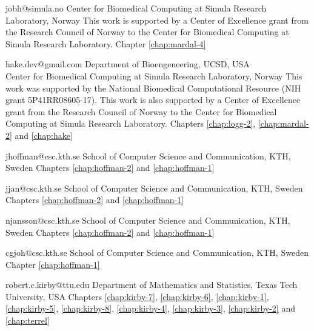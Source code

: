              {jobh@simula.no}
             {Center for Biomedical Computing at Simula Research
              Laboratory, Norway}
             {This work is supported by a Center of
              Excellence grant from the Research Council of Norway to
              the Center for Biomedical Computing at Simula Research
              Laboratory.}
             {Chapter \ref{chap:mardal-4}}

             {hake.dev@gmail.com}
             {Department of Bioengeneering, UCSD, USA\\
              Center for Biomedical Computing at Simula Research
              Laboratory, Norway}
             {This work was supported by the National Biomedical
              Computational Resource (NIH grant 5P41RR08605-17).
              This work is also supported by a Center of
              Excellence grant from the Research Council of Norway to
              the Center for Biomedical Computing at Simula Research
              Laboratory.}
             {Chapters \ref{chap:logg-2}, \ref{chap:mardal-2} and \ref{chap:hake}}

             {jhoffman@csc.kth.se}
             {School of Computer Science and Communication, KTH, Sweden}
             {}
             {Chapters \ref{chap:hoffman-2} and \ref{chap:hoffman-1}}

             {jjan@csc.kth.se}
             {School of Computer Science and Communication, KTH, Sweden}
             {}
             {Chapters \ref{chap:hoffman-2} and \ref{chap:hoffman-1}}

             {njansson@csc.kth.se}
             {School of Computer Science and Communication, KTH, Sweden}
             {}
             {Chapters \ref{chap:hoffman-2} and \ref{chap:hoffman-1}}

             {cgjoh@csc.kth.se}
             {School of Computer Science and Communication, KTH, Sweden}
             {}
             {Chapter \ref{chap:hoffman-1}}

             {robert.c.kirby@ttu.edu}
             {Department of Mathematics and Statistics, Texas Tech University, USA}
             {}
             {Chapters
              \ref{chap:kirby-7},
              \ref{chap:kirby-6},
              \ref{chap:kirby-1},
              \ref{chap:kirby-5},
              \ref{chap:kirby-8},
              \ref{chap:kirby-4},
              \ref{chap:kirby-3},
              \ref{chap:kirby-2} and
              \ref{chap:terrel}}

